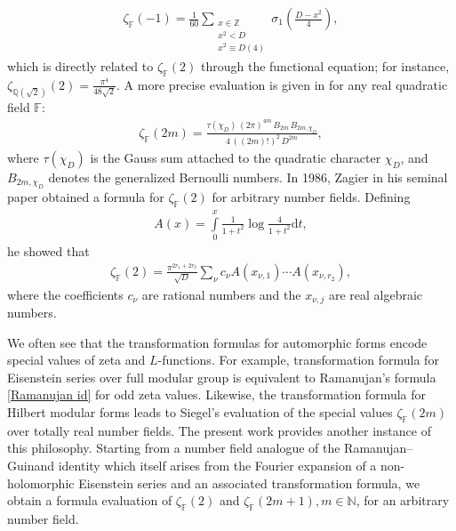 \documentclass[12pt,reqno]{amsart}
\renewcommand{\(}{\left\(}
\renewcommand{\)}{\right\)}
\renewcommand{\[}{\left\[}
\renewcommand{\]}{\right\]}
\numberwithin{equation}{section}
\theoremstyle{plain}
\begin{document}
\begin{align}\label{Zeta(-1)}
\zeta_\mathbb{F}(-1) = \frac{1}{60}\sum_{\substack{x\in \mathbb{Z} \\ x^2 < D \\ x^2 \equiv D(4)}} \sigma_1\left(\frac{D-x^2}{4}\right),
\end{align}
which is directly related to $\zeta_{\mathbb{F}}(2)$ through the functional equation; for instance, $\zeta_{\mathbb{Q}(\sqrt{2})}(2) = \frac{\pi^4}{48\sqrt{2}}$.  A more precise evaluation is given in \cite{BCH21} for any real quadratic field $\mathbb{F}$:
\begin{align*}
\zeta_\mathbb{F}(2m) = \frac{\tau(\chi_D)\,(2\pi)^{4m}\, B_{2m}\, B_{2m,\chi_D}}
{4\,((2m)!)^{2}\, D^{2m}},
\end{align*}
where $\tau(\chi_D)$ is the Gauss sum attached to the quadratic character $\chi_D$, and $B_{2m,\chi_D}$ denotes the generalized Bernoulli numbers. 
In 1986, Zagier \cite{Zagier} in his seminal paper  obtained a formula for $\zeta_\mathbb{F}(2)$ for arbitrary number fields. Defining
\begin{align*}
A(x) = \int\limits_0^x \frac{1}{1+t^2}\log\frac{4}{1+t^2} \text{d}t,
\end{align*}
he showed that
\begin{align*}
\zeta_\mathbb{F}(2) = \frac{\pi^{2r_1+2r_2}}{\sqrt{D}}\sum_\nu c_\nu A(x_{\nu, 1})\cdots A(x_{\nu, r_2}),
\end{align*}
where the coefficients $c_\nu$ are rational numbers and the $x_{\nu,j}$ are real algebraic numbers. 

We often see that the transformation formulas for automorphic forms encode special values of zeta and $L$-functions. For example, transformation formula for Eisenstein series over full modular group is equivalent to Ramanujan's formula \eqref{Ramanujan id}  for odd zeta values. Likewise, the transformation formula for Hilbert modular forms leads to Siegel's evaluation of the special values $\zeta_\mathbb{F}(2m)$ over totally real number fields.
  The present work provides another instance of this philosophy. Starting from a number field analogue of the Ramanujan--Guinand identity which itself arises from the Fourier expansion of a non-holomorphic Eisenstein series and an associated transformation formula, we obtain a formula evaluation of $\zeta_\mathbb{F}(2)$ and $\zeta_\mathbb{F}(2m+1), m \in \mathbb{N}$, for an arbitrary number field. 
  
\end{document}
